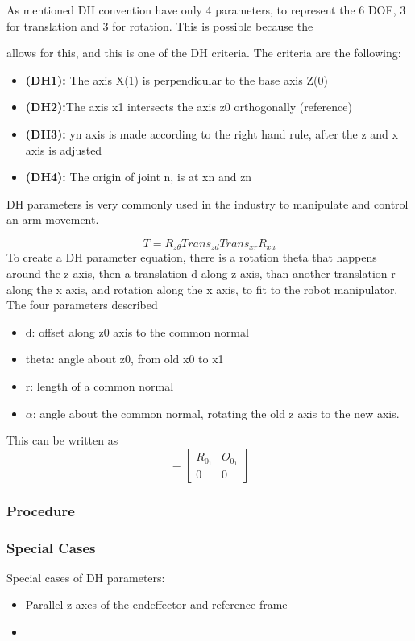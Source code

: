 As mentioned DH convention have only 4 parameters, to represent the 6 DOF, 3 for translation and 3 for rotation. This is possible because the  


allows for this, and this is one of the DH criteria. The criteria are the following:
\begin{itemize}
    \item \textbf{(DH1):} The axis X(1) is perpendicular to the base axis Z(0)
    \item \textbf{(DH2):}The axis x1 intersects the axis z0 orthogonally (reference)
    \item \textbf{(DH3):} yn axis is made according to the right hand rule, after the z and x axis is adjusted
    \item \textbf{(DH4):} The origin of joint n, is at xn and zn
\end{itemize}

DH parameters is very commonly used in the industry to manipulate and control an arm movement.


\begin{equation}
    T = R_{z \theta} Trans_{z d} Trans_{x r} R_{x a}
\end{equation}
To create a DH parameter equation, there is a rotation theta that happens around the z axis, then a translation d along z axis, than another translation r along the x axis, and rotation along the x axis, to fit to the robot manipulator.
The four parameters described
\begin{itemize}
    \item d: offset along z0 axis to the common normal
    \item theta: angle about z0, from old x0 to x1
    \item r: length of a common normal
    \item $\alpha$: angle about the common normal, rotating the old z axis to the new axis.
\end{itemize}

This can be written as 
\begin{equation}
    [T] =
    \begin{bmatrix}
        R_{0_1} &  O_{0_1} \\
        0 & 0
    \end{bmatrix}
\end{equation}



\subsubsection{Procedure}


\subsubsection{Special Cases}
Special cases of DH parameters:
\begin{itemize}
    \item Parallel z axes of the endeffector and reference frame
    \item 
\end{itemize}


